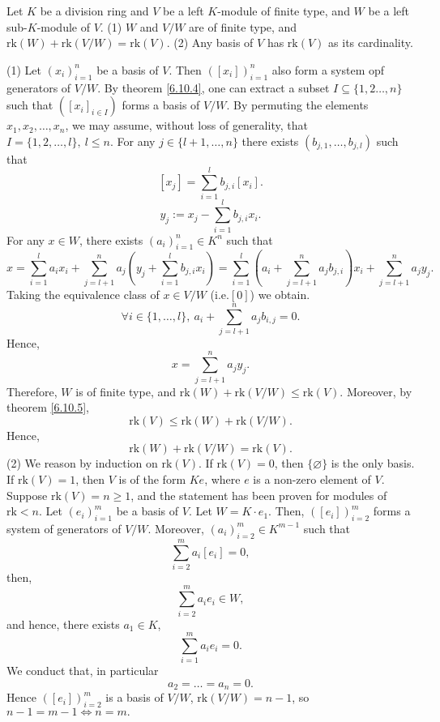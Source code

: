 \begin{theoremenv}
    Let $K$ be a division ring and $V$ be a left $K$-module of finite type, and $W$ be a left sub-$K$-module of $V$. 
    \newline
    (1) $W$ and $V/W$ are of finite type, and $\mathrm{rk}(W)+\mathrm{rk}(V/W)=\mathrm{rk}(V)$.
    \newline
    (2) Any basis of $V$ has $\mathrm{rk}(V)$ as its cardinality.
\end{theoremenv}
\begin{proofenv}
    \quad\newline
    (1) Let $\left(x_i\right)_{i=1}^n$ be a basis of $V$. Then $\left([x_i]\right)_{i=1}^n$ also form a system opf generators of $V/W$. By theorem \ref{6.10.4}, one can extract a subset $I\subseteq\{1,2\dots,n\}$ such that $\left([x_i]_{i\in I}\right)$ forms a basis of $V/W$. By permuting the elements $x_1,x_2,\dots, x_n$, we may assume, without loss of generality, that $I=\{1,2,\dots,l\},\ l\le n$. For any $j\in\{l+1,\dots, n\}$ there exists $(b_{j,1},\dots,b_{j,l})$ such that 
     $$[x_j]=\sum_{i=1}^{l}b_{j,i}[x_{i}].$$
     $$y_j:=x_j-\sum_{i=1}^{l}b_{j,i}x_i.$$
     For any $x\in W$, there exists $\left(a_i\right)_{i=1}^n\in K^n$ such that 
     $$x=\sum_{i=1}^{l}a_ix_i+\sum_{j=l+1}^{n}a_j\left(y_j+\sum_{i=1}^{l}b_{j,i}x_i\right)=\sum_{i=1}^{l}\left(a_i+\sum_{j=l+1}^{n}a_jb_{j,i}\right)x_i+\sum_{j=l+1}^{n}a_jy_j.$$
     Taking the equivalence class of $x\in V/W$ (i.e.$[0]$) we obtain. 
     $$\forall i\in \{1,\dots,l\},\ a_i+\sum_{j=l+1}^{n}a_jb_{i,j}=0.$$
     Hence, 
     $$x=\sum_{j=l+1}^{n}a_jy_j.$$
     Therefore, $W$ is of finite type, and $\mathrm{rk}(W)+\mathrm{rk}(V/W)\le \mathrm{rk}(V)$. Moreover, by theorem \ref{6.10.5},
     $$\mathrm{rk}(V)\le\mathrm{rk}(W)+\mathrm{rk}(V/W).$$
     Hence, $$\mathrm{rk}(W)+\mathrm{rk}(V/W)=\mathrm{rk}(V).$$
     (2) We reason by induction on $\mathrm{rk}(V)$. If $\mathrm{rk}(V)=0$, then $\{\varnothing\}$ is the only basis. If $\mathrm{rk}(V)=1$, then $V$ is of the form $Ke$, where $e$ is a non-zero element of $V$. Suppose $\mathrm{rk}(V)=n\ge 1$, and the statement has been proven for modules of $\mathrm{rk}<n$. Let $\left(e_i\right)_{i=1}^m$ be a basis of $V$. Let $W=K\cdot e_1$. Then, $\left([e_i]\right)_{i=2}^m$ forms a system of generators of $V/W$. Moreover, $\left(a_i\right)_{i=2}^m\in K^{m-1}$ such that 
     $$\sum_{i=2}^{m}a_i[e_i]=0,$$
     then,
     $$\sum_{i=2}^{m}a_ie_i\in W,$$
     and hence, there exists $a_1\in K$,
     $$\sum_{i=1}^{m}a_ie_i=0.$$
     We conduct that, in particular
     $$a_2=\dots=a_n=0.$$
     Hence $\left([e_i]\right)_{i=2}^m$ is a basis of $V/W$, $\mathrm{rk}(V/W)=n-1$, so $n-1=m-1\Leftrightarrow n=m.$
\end{proofenv}

